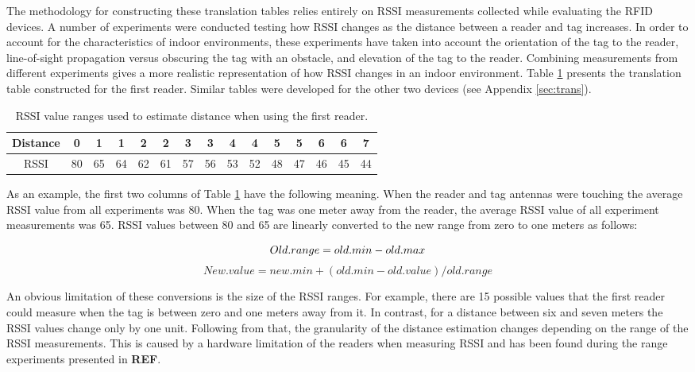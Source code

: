 The methodology for constructing these translation tables relies entirely on RSSI measurements collected while evaluating the RFID devices. A number of experiments were conducted testing how RSSI changes as the distance between a reader and tag increases. In order to account for the characteristics of indoor environments, these experiments have taken into account the orientation of the tag to the reader, line-of-sight propagation versus obscuring the tag with an obstacle, and elevation of the tag to the reader. Combining measurements from different experiments gives a more realistic representation of how RSSI changes in an indoor environment. Table \ref{tbl:trans} presents the translation table constructed for the first reader. Similar tables were developed for the other two devices (see Appendix \ref{sec:trans}).

\begin{table}[h]
	\centering
	\begin{tabular}{ | c | c | c || c | c || c | c || c | c || c | c || c | c || c | c | }
		\hline
		Distance 	& 0  & 1  & 1  & 2  & 2  & 3  & 3  & 4  & 4  & 5  & 5  & 6  & 6  & 7  \\ \hline
		RSSI 		& 80 & 65 & 64 & 62 & 61 & 57 & 56 & 53 & 52 & 48 & 47 & 46 & 45 & 44  \\ \hline
	\end{tabular}
	\caption{RSSI value ranges used to estimate distance when using the first reader.}
	\label{tbl:trans}
\end{table}

As an example, the first two columns of Table \ref{tbl:trans} have the following meaning. When the reader and tag antennas were touching the average RSSI value from all experiments was 80. When the tag was one meter away from the reader, the average RSSI value of all experiment measurements was 65. RSSI values between 80 and 65 are linearly converted to the new range from zero to one meters as follows: 

\[Old.range = old.min - old.max \\\]
\[New.value = new.min + (old.min - old.value) / old.range\]

An obvious limitation of these conversions is the size of the RSSI ranges. For example, there are 15 possible values that the first reader could measure when the tag is between zero and one meters away from it. In contrast, for a distance between six and seven meters the RSSI values change only by one unit. Following from that, the granularity of the distance estimation changes depending on the range of the RSSI measurements. This is caused by a hardware limitation of the readers when measuring RSSI and has been found during the range experiments presented in \textbf{REF}.

